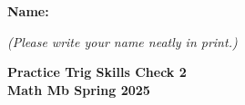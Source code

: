 \documentclass{article}
\begin{document}
 

 \noindent
{\large \mbox{} \hfill \bf Name:\underline{\hspace{2.8in}}}

 {\mbox{} \hfill \it (Please write your name neatly in print.)}


 
\medskip
 
\noindent
{\large\bf
Practice Trig Skills Check 2 \\ Math Mb Spring 2025}
\noindent

\end{document}

